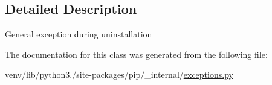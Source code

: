 \subsection{Detailed Description}
\begin{DoxyVerb}General exception during uninstallation\end{DoxyVerb}
 

The documentation for this class was generated from the following file\+:\begin{DoxyCompactItemize}
\item 
venv/lib/python3./site-\/packages/pip/\+\_\+internal/\hyperlink{pip_2__internal_2exceptions_8py}{exceptions.\+py}\end{DoxyCompactItemize}
